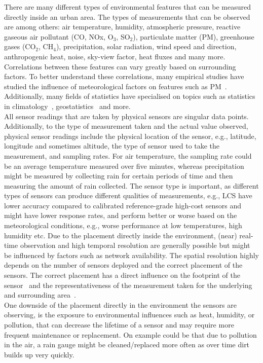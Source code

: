 There are many different types of environmental features that can be measured directly inside an urban area. The types of measurements that can be observed are among others: air temperature, humidity, atmospheric pressure, reactive gaseous air pollutant (CO, NOx, O$_3$, SO$_2$), particulate matter (PM), greenhouse gases (CO$_2$, CH$_4$), precipitation, solar radiation, wind speed and direction, anthropogenic heat, noise, sky-view factor, heat fluxes and many more.
Correlations between these features can vary greatly based on surrounding factors. To better understand these correlations, many empirical studies have studied the influence of meteorological factors on features such as PM~\cite{tai2010correlations}. Additionally, many fields of statistics have specialised on topics such as statistics in climatology~\cite{von2002statistical}, geostatistics~\cite{trangmar1986application} and more.\\
All sensor readings that are taken by physical sensors are singular data points. Additionally, to the type of measurement taken and the actual value observed, physical sensor readings include the physical location of the sensor, e.g., latitude, longitude and sometimes altitude, the type of sensor used to take the measurement, and sampling rates. For air temperature, the sampling rate could be an average temperature measured over five minutes, whereas precipitation might be measured by collecting rain for certain periods of time and then measuring the amount of rain collected. The sensor type is important, as different types of sensors can produce different qualities of measurements, e.g., LCS have lower accuracy compared to calibrated reference-grade high-cost sensors and might have lower response rates, and perform better or worse based on the meteorological conditions, e.g., worse performance at low temperatures, high humidity etc. Due to the placement directly inside the environment, (near) real-time observation and high temporal resolution are generally possible but might be influenced by factors such as network availability. The spatial resolution highly depends on the number of sensors deployed and the correct placement of the sensors. The correct placement has a direct influence on the footprint of the sensor~\cite{leclerc2014footprints} and the representativeness of the measurement taken for the underlying and surrounding area~\cite{oke2006guideline}.\\
One downside of the placement directly in the environment the sensors are observing, is the exposure to environmental influences such as heat, humidity, or pollution, that can decrease the lifetime of a sensor and may require more frequent maintenance or replacement. On example could be that due to pollution in the air, a rain gauge might be cleaned/replaced more often as over time dirt builds up very quickly.

